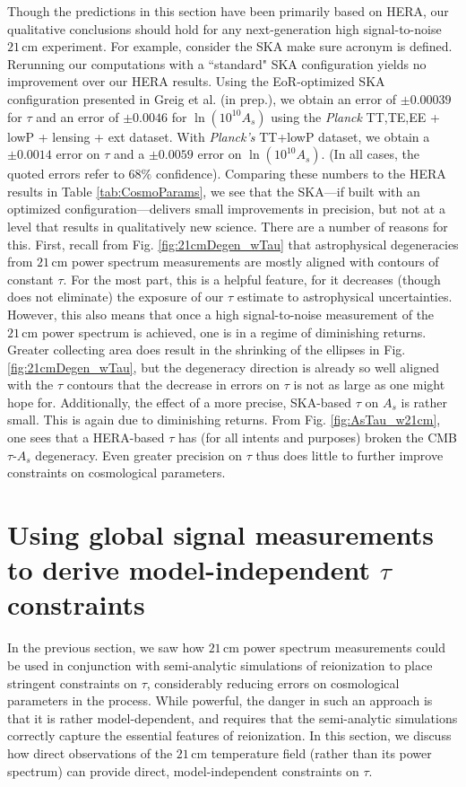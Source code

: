 \documentclass[twocolumn,aps,prd,nofootinbib,showpacs]{revtex4-1}
\begin{document}
Though the predictions in this section have been primarily based on HERA, our qualitative conclusions should hold for any next-generation high signal-to-noise $21\,\textrm{cm}$ experiment. For example, consider the SKA \acl{make sure acronym is defined}. Rerunning our computations with a ``standard" SKA configuration yields no improvement over our HERA results. Using the EoR-optimized SKA configuration presented in Greig et al. (in prep.), we obtain an error of $\pm 0.00039$ for $\tau$ and an error of $\pm 0.0046$ for $\ln (10^{10} A_s)$ using the \emph{Planck} TT,TE,EE + lowP + lensing + ext dataset. With \emph{Planck's} TT+lowP dataset, we obtain a $\pm 0.0014$ error on $\tau$ and a $\pm 0.0059$ error on $\ln (10^{10} A_s)$. (In all cases, the quoted errors refer to $68\%$ confidence). Comparing these numbers to the HERA results in Table \ref{tab:CosmoParams}, we see that the SKA---if built with an optimized configuration---delivers small improvements in precision, but not at a level that results in qualitatively new science. There are a number of reasons for this. First, recall from Fig. \ref{fig:21cmDegen_wTau} that astrophysical degeneracies from $21\,\textrm{cm}$ power spectrum measurements are mostly aligned with contours of constant $\tau$. For the most part, this is a helpful feature, for it decreases (though does not eliminate) the exposure of our $\tau$ estimate to astrophysical uncertainties. However, this also means that once a high signal-to-noise measurement of the $21\,\textrm{cm}$ power spectrum is achieved, one is in a regime of diminishing returns. Greater collecting area does result in the shrinking of the ellipses in Fig. \ref{fig:21cmDegen_wTau}, but the degeneracy direction is already so well aligned with the $\tau$ contours that the decrease in errors on $\tau$ is not as large as one might hope for. Additionally, the effect of a more precise, SKA-based $\tau$ on $A_s$ is rather small. This is again due to diminishing returns. From Fig. \ref{fig:AsTau_w21cm}, one sees that a HERA-based $\tau$ has (for all intents and purposes) broken the CMB $\tau$-$A_s$ degeneracy. Even greater precision on $\tau$ thus does little to further improve constraints on cosmological parameters.

\section{Using global signal measurements to derive model-independent $\tau$ constraints}
\label{sec:GlobalSig}

In the previous section, we saw how $21\,\textrm{cm}$ power spectrum measurements could be used in conjunction with semi-analytic simulations of reionization to place stringent constraints on $\tau$, considerably reducing errors on cosmological parameters in the process. While powerful, the danger in such an approach is that it is rather model-dependent, and requires that the semi-analytic simulations correctly capture the essential features of reionization. In this section, we discuss how direct observations of the $21\,\textrm{cm}$ temperature field (rather than its power spectrum) can provide direct, model-independent constraints on $\tau$.
\end{document}
